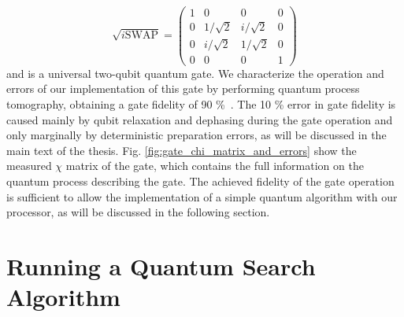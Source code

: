 \begin{equation}
	\sqrt{i\mathrm{SWAP}}  =  \left( \begin{array}{cccc} 1 & 0 & 0 & 0 \\ 0 & 1/\sqrt{2} & i/\sqrt{2} & 0 \\ 0 & i/\sqrt{2} & 1/\sqrt{2} & 0 \\ 0 & 0 & 0 & 1 \end{array} \right) \label{eq:sqrt_iswap_gate}
\end{equation}
and is a universal two-qubit quantum gate. We characterize the operation and errors of our implementation of this gate by performing quantum process tomography, obtaining a gate fidelity of 90 \%\ . The 10 \% error in gate fidelity is caused mainly by qubit relaxation and dephasing during the gate operation and only marginally by deterministic preparation errors, as will be discussed in the main text of the thesis. Fig. \ref{fig:gate_chi_matrix_and_errors} show the measured $\chi$ matrix of the gate, which contains the full information on the quantum process describing the gate. The achieved fidelity of the gate operation is sufficient to allow the implementation of a simple quantum algorithm with our processor, as will be discussed in the following section.
 
\section{Running a Quantum Search Algorithm}

